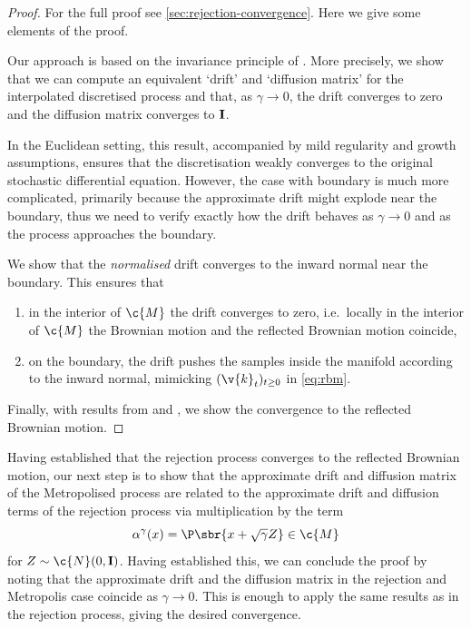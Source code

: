 \begin{proof}
	For the full proof see \cref{sec:rejection-convergence}.
	Here we give some elements of the proof.

	Our approach is based on the invariance principle of \textcite{stroock1971diffusion}.
	More precisely, we show that we can compute an equivalent `drift' and `diffusion matrix' for the interpolated discretised process and that, as \(\gamma \to 0\), the drift converges to zero and the diffusion matrix converges to \(\m{I}\).

	In the Euclidean setting, this result, accompanied by mild regularity and growth assumptions, ensures that the discretisation weakly converges to the original stochastic differential equation.
	However, the case with boundary is much more complicated, primarily because the approximate drift might explode near the boundary, thus we need to verify exactly how the drift behaves as \(\gamma \to 0\) and as the process approaches the boundary.

	We show that the \emph{normalised} drift converges to the inward normal near the boundary.
	This ensures that \begin{enumerate}[label=(\alph*)] \item in the interior of \(\c{M}\) the drift converges to zero, i.e.~locally in the interior of \(\c{M}\) the Brownian motion and the reflected Brownian motion coincide, \item on the boundary, the drift pushes the samples inside the manifold according to the inward normal, mimicking \((\v{k}_t)_{t \geq 0}\) in \cref{eq:rbm}.
	\end{enumerate}
	Finally, with results from \textcite{stroock1971diffusion} and \textcite{kang2017submartingale}, we show the convergence to the reflected Brownian motion.
\end{proof}

Having established that the rejection process converges to the reflected Brownian motion, our next step is to show that the approximate drift and diffusion matrix of the Metropolised process are related to the approximate drift and diffusion terms of the rejection process via multiplication by the term 
\[
	\alpha^\gamma(x) = \P\sbr{x + \sqrt{\gamma} Z} \in \c{M}	
\]
for \(Z\sim \c{N}(0, \m{I})\).
Having established this, we can conclude the proof by noting that the approximate drift and the diffusion matrix in the rejection and Metropolis case coincide as \(\gamma \to 0\).
This is enough to apply the same results as in the rejection process, giving the desired convergence.


